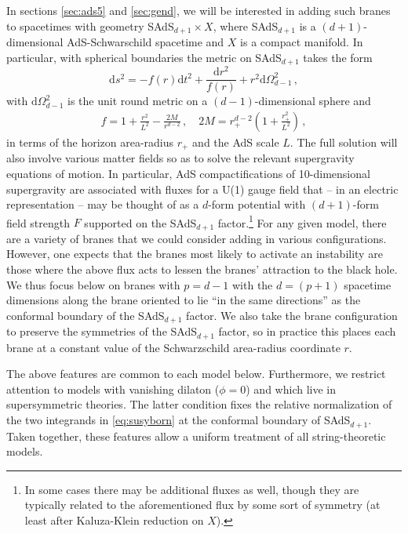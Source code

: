 \documentclass[11pt]{article}
\begin{document}
In sections \ref{sec:ads5} and \ref{sec:gend}, we will be interested in adding such branes to spacetimes with geometry SAdS$_{d+1}\times X$, where SAdS$_{d+1}$ is a $(d+1)$-dimensional AdS-Schwarschild spacetime and $X$ is a compact manifold.  
In particular, with spherical boundaries the metric on SAdS$_{d+1}$ takes the form
\begin{equation}
\mathrm{d}s^2=-f(r)\mathrm{d}t^2+\frac{\mathrm{d}r^2}{f(r)}+r^2\mathrm{d}\Omega_{d-1}^2\,,
\label{eq:refanyd}
\end{equation}
with $\mathrm{d}\Omega^2_{d-1}$ is the unit round metric on a $(d-1)$-dimensional sphere and
\begin{align}
    f = 1 + \frac{r^2}{L^2} - \frac{2M}{r^{d-2}} \, , \quad  2M = r_+^{d-2}\left(1+\frac{r_+^2}{L^2}\right)\, ,
\end{align}
in terms of the horizon area-radius $r_+$ and the AdS scale $L$.
The full solution will also involve various matter fields so as to solve the relevant supergravity equations of motion.  
In particular, AdS compactifications of 10-dimensional supergravity are associated with fluxes for a U(1) gauge field that -- in an electric representation -- may be thought of as a $d$-form potential with $(d+1)$-form field strength $F$ supported on the SAdS$_{d+1}$ factor.\footnote{
    In some cases there may be additional fluxes as well, though they are typically related to the aforementioned flux by some sort of symmetry (at least after Kaluza-Klein reduction on $X$). 
}
For any given model, there are a variety of branes that we could consider adding in various configurations.
However, one expects that the branes most likely to activate an instability are those where the above flux acts to lessen the branes' attraction to the black hole.
We thus focus below on branes with $p=d-1$ with the $d = (p+1)$ spacetime dimensions along the brane oriented to lie ``in the same directions'' as the conformal boundary of the SAdS$_{d+1}$ factor.
We also take the brane configuration to preserve the symmetries of the SAdS$_{d+1}$ factor, so in practice this places each brane at a constant value of the Schwarzschild area-radius coordinate $r$.

The above features are common to each model below.  
Furthermore, we restrict attention to models with vanishing dilaton ($\phi=0$) and which live in supersymmetric theories.  
The latter condition fixes the relative normalization of the two integrands in \ref{eq:susyborn} at the conformal boundary of SAdS$_{d+1}$.  
Taken together, these features allow a uniform treatment of all string-theoretic models.
\end{document}
